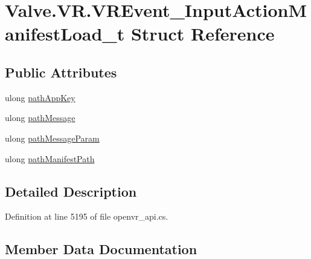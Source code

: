 \hypertarget{struct_valve_1_1_v_r_1_1_v_r_event___input_action_manifest_load__t}{}\section{Valve.\+V\+R.\+V\+R\+Event\+\_\+\+Input\+Action\+Manifest\+Load\+\_\+t Struct Reference}
\label{struct_valve_1_1_v_r_1_1_v_r_event___input_action_manifest_load__t}
\subsection*{Public Attributes}
\begin{DoxyCompactItemize}
\item 
ulong \mbox{\hyperlink{struct_valve_1_1_v_r_1_1_v_r_event___input_action_manifest_load__t_a3ad24418caff57466d8d9f39f8f13d8c}{path\+App\+Key}}
\item 
ulong \mbox{\hyperlink{struct_valve_1_1_v_r_1_1_v_r_event___input_action_manifest_load__t_aeaf7e7d1bc9cb05106f2f0e0b6e412f0}{path\+Message}}
\item 
ulong \mbox{\hyperlink{struct_valve_1_1_v_r_1_1_v_r_event___input_action_manifest_load__t_a51cf161b1ccbf74292e703e46a9cbfb1}{path\+Message\+Param}}
\item 
ulong \mbox{\hyperlink{struct_valve_1_1_v_r_1_1_v_r_event___input_action_manifest_load__t_ac7e8606d45f7589153871b2ca76dbded}{path\+Manifest\+Path}}
\end{DoxyCompactItemize}


\subsection{Detailed Description}


Definition at line 5195 of file openvr\+\_\+api.\+cs.



\subsection{Member Data Documentation}
\mbox{\label{struct_valve_1_1_v_r_1_1_v_r_event___input_action_manifest_load__t_a3ad24418caff57466d8d9f39f8f13d8c}} 
